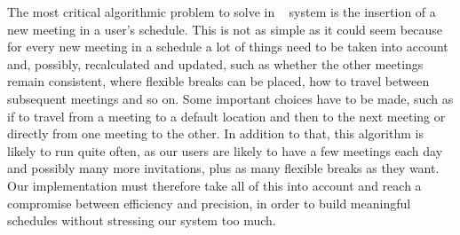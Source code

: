 The most critical algorithmic problem to solve in \projectname~ system is the insertion of a new meeting in a user's schedule. This is not as simple as it could seem because for every new meeting in a schedule a lot of things need to be taken into account and, possibly, recalculated and updated, such as whether the other meetings remain consistent, where flexible breaks can be placed, how to travel between subsequent meetings and so on. Some important choices have to be made, such as if to travel from a meeting to a default location and then to the next meeting or directly from one meeting to the other. In addition to that, this algorithm is likely to run quite often, as our users are likely to have a few meetings each day and possibly many more invitations, plus as many flexible breaks as they want. Our implementation must therefore take all of this into account and reach a compromise between efficiency and precision, in order to build meaningful schedules without stressing our system too much.